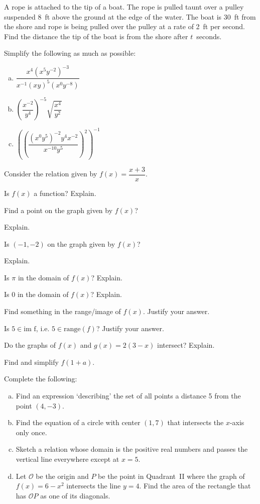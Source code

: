 \documentclass[11pt,letterpaper]{article}
\begin{document}
\prob A rope is attached to the tip of a boat. The rope is pulled taunt over a pulley suspended 8~ft above the ground at the edge of the water. The boat is 30~ft from the shore and rope is being pulled over the pulley at a rate of 2~ft per second. Find the distance the tip of the boat is from the shore after $t$~seconds. \pspace



\prob Simplify the following as much as possible:
	\begin{enumerate}[(a)]
	\item $\dfrac{x^4 (x^5 y^{-2})^{-3}}{x^{-1} (x y)^5 (x^0 y^{-8})}$
	\item $\left( \dfrac{x^{-2}}{y^4} \right)^{-5} \sqrt{\dfrac{x^4}{y^2}}$
	\item $\left( \left( \dfrac{(x^0 y^5)^{-2} y^4 x^{-2}}{x^{-10} y^5} \right)^2 \right)^{-1}$
	\end{enumerate}



\newpage



\prob Consider the relation given by $f(x)= \dfrac{x + 3}{x}$.
	\begin{2enumerate}
	\item Is $f(x)$ a function? Explain. 
	\item Find a point on the graph given by $f(x)$? \par Explain.
	\item Is $(-1, -2)$ on the graph given by $f(x)$? \par Explain.
	\item Is $\pi$ in the domain of $f(x)$? Explain.
	\item Is $0$ in the domain of $f(x)$? Explain. 
	\item Find something in the range/image of $f(x)$. Justify your answer. 
	\item Is $5 \in \text{im f}$, i.e. $5 \in \text{range}(f)$? Justify your answer. 
	\item Do the graphs of $f(x)$ and $g(x)= 2(3 - x)$ intersect? Explain. 
	\item Find and simplify $f(1 + a)$. 
	\end{2enumerate} \pspace



\prob Complete the following:
	\begin{enumerate}[(a)]
	\item Find an expression `describing' the set of all points a distance 5 from the point $(4, -3)$. 
	\item Find the equation of a circle with center $(1, 7)$ that intersects the $x$-axis only once. 
	\item Sketch a relation whose domain is the positive real numbers and passes the vertical line everywhere except at $x= 5$.
	\item Let $\mathcal{O}$ be the origin and $P$ be the point in Quadrant~II where the graph of $f(x)= 6 - x^2$ intersects the line $y= 4$. Find the area of the rectangle that has $\mathcal{O}P$ as one of its diagonals. 
	\end{enumerate} \pspace
\end{document}
